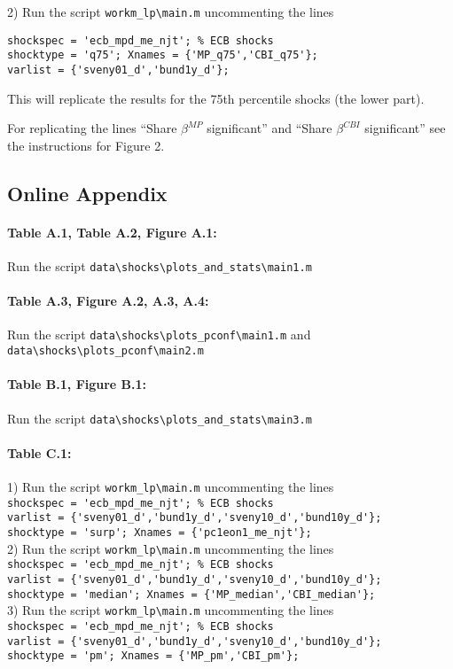 \documentclass[12pt]{article}
\begin{document}
2) Run the script
\verb|workm_lp\main.m| uncommenting the lines
\begin{verbatim}
shockspec = 'ecb_mpd_me_njt'; % ECB shocks
shocktype = 'q75'; Xnames = {'MP_q75','CBI_q75'};
varlist = {'sveny01_d','bund1y_d'};
\end{verbatim}
This will replicate the results for the 75th percentile shocks (the lower part).

For replicating the lines ``Share $\beta^{MP}$ significant'' and 
``Share $\beta^{CBI}$ significant'' see the instructions for Figure 2.

\subsection{Online Appendix}

\paragraph{Table A.1, Table A.2, Figure A.1:} Run the script
\verb|data\shocks\plots_and_stats\main1.m|

\paragraph{Table A.3, Figure A.2, A.3, A.4:} Run the script
\verb|data\shocks\plots_pconf\main1.m| and
\verb|data\shocks\plots_pconf\main2.m|

\paragraph{Table B.1, Figure B.1: } Run the script
\verb|data\shocks\plots_and_stats\main3.m|

\paragraph{Table C.1:}
1) Run the script
\verb|workm_lp\main.m| uncommenting the lines\\
\verb|shockspec = 'ecb_mpd_me_njt'; % ECB shocks|\\
\verb|varlist = {'sveny01_d','bund1y_d','sveny10_d','bund10y_d'};|\\
\verb|shocktype = 'surp'; Xnames = {'pc1eon1_me_njt'};|\\
2) Run the script
\verb|workm_lp\main.m| uncommenting the lines\\
\verb|shockspec = 'ecb_mpd_me_njt'; % ECB shocks|\\
\verb|varlist = {'sveny01_d','bund1y_d','sveny10_d','bund10y_d'};|\\
\verb|shocktype = 'median'; Xnames = {'MP_median','CBI_median'};|\\
3) Run the script
\verb|workm_lp\main.m| uncommenting the lines\\
\verb|shockspec = 'ecb_mpd_me_njt'; % ECB shocks|\\
\verb|varlist = {'sveny01_d','bund1y_d','sveny10_d','bund10y_d'};|\\
\verb|shocktype = 'pm'; Xnames = {'MP_pm','CBI_pm'};|\\
\end{document}

